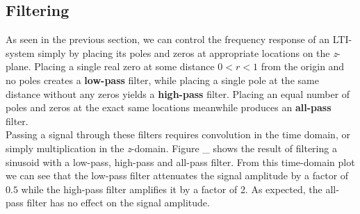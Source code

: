 \documentclass[journal]{IEEEtran}
\begin{document}
\subsection{Filtering} 
As seen in the previous section, we can control the frequency response of an LTI-system simply by placing its poles and zeros at appropriate locations on the \textit{z}-plane. Placing a single real zero at some distance $0<r<1$ from the origin and no poles creates a \textbf{low-pass} filter, while placing a single pole at the same distance without any zeros yields a \textbf{high-pass} filter. Placing an equal number of poles and zeros at the exact same locations meanwhile produces an \textbf{all-pass} filter. \\
Passing a signal through these filters requires convolution in the time domain, or simply multiplication in the \textit{z}-domain. Figure \_ shows the result of filtering a sinusoid with a low-pass, high-pass and all-pass filter. From this time-domain plot we can see that the low-pass filter attenuates the signal amplitude by a factor of $0.5$ while the high-pass filter amplifies it by a factor of 2. As expected, the all-pass filter has no effect on the signal amplitude. 

\end{document}
